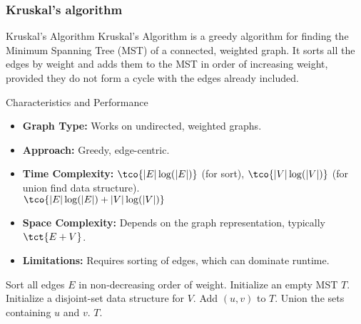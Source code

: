 \newpage
\subsubsection{Kruskal's algorithm}
\begin{definition}[]{Kruskal's Algorithm}
    Kruskal's Algorithm is a greedy algorithm for finding the Minimum Spanning Tree (MST) of a connected, weighted graph. It sorts all the edges by weight and adds them to the MST in order of increasing weight, provided they do not form a cycle with the edges already included.
\end{definition}

\begin{properties}[]{Characteristics and Performance}
    \begin{itemize}
        \item \textbf{Graph Type:} Works on undirected, weighted graphs.
        \item \textbf{Approach:} Greedy, edge-centric.
        \item \textbf{Time Complexity:} $\tco{|E| \log (|E|)}$ (for sort), $\tco{|V| \log(|V|)}$ (for union find data structure).\\
              \timecomplexity $\tco{|E| \log(|E|) + |V| \log(|V|)}$
        \item \textbf{Space Complexity:} Depends on the graph representation, typically $\tct{E + V}$.
        \item \textbf{Limitations:} Requires sorting of edges, which can dominate runtime.
    \end{itemize}
\end{properties}

\begin{algorithm}
    \caption{Kruskal's Algorithm}
    \begin{algorithmic}[1]
            \State Sort all edges $E$ in non-decreasing order of weight.
            \State Initialize an empty MST $T$.
            \State Initialize a disjoint-set data structure for $V$.
                    \State Add $(u, v)$ to $T$.
                    \State Union the sets containing $u$ and $v$.
                \EndIf
            \EndFor
            \State \Return $T$.
        \EndProcedure
    \end{algorithmic}
\end{algorithm}

